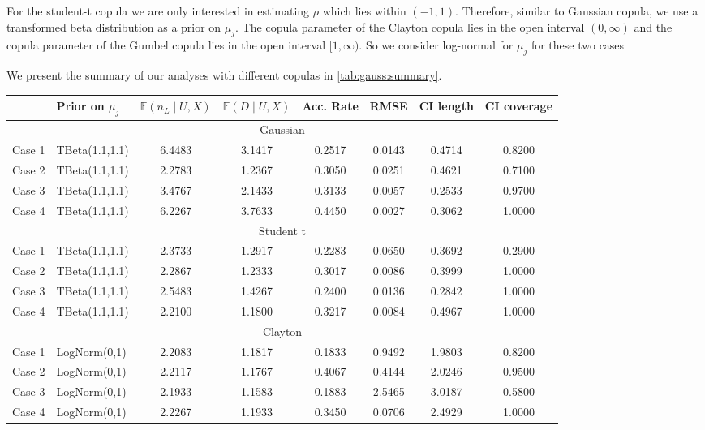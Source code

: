 \documentclass{amsart}
\begin{document}
For the student-t copula we are only interested in estimating $\rho$ which lies within $(-1,1)$. Therefore, similar to Gaussian copula, we use a transformed beta distribution as a prior on $\mu_j$. The copula parameter of the Clayton copula lies in the open interval $(0,\infty)$ and the copula parameter of the Gumbel copula lies in the open interval $[1,\infty)$. So we consider log-normal for $\mu_j$ for these two cases

We present the summary of our analyses with different copulas in \cref{tab:gauss:summary}. 

\begin{table}[ht]
	\centering
	\scriptsize{
	\begin{tabular}{ll|cccccc}
		\toprule
		& Prior on $\mu_j$ & $\mathbb{E}(n_L\mid U,X)$ & $\mathbb{E}(D\mid U,X)$ & Acc. Rate & RMSE & CI length & CI coverage \\ 
		\midrule
		\multicolumn{8}{c}{Gaussian} \\
		\midrule
		Case 1 & TBeta(1.1,1.1) & 6.4483 & 3.1417 & 0.2517 & 0.0143 & 0.4714 & 0.8200 \\ 
		Case 2 & TBeta(1.1,1.1) & 2.2783 & 1.2367 & 0.3050 & 0.0251 & 0.4621 & 0.7100 \\ 
		Case 3 & TBeta(1.1,1.1) & 3.4767 & 2.1433 & 0.3133 & 0.0057 & 0.2533 & 0.9700 \\ 
		Case 4 & TBeta(1.1,1.1) & 6.2267 & 3.7633 & 0.4450 & 0.0027 & 0.3062 & 1.0000 \\ 
		\midrule
		\multicolumn{8}{c}{Student t} \\
		\midrule
		Case 1 & TBeta(1.1,1.1) & 2.3733 & 1.2917 & 0.2283 & 0.0650 & 0.3692 & 0.2900 \\ 
		Case 2 & TBeta(1.1,1.1) & 2.2867 & 1.2333 & 0.3017 & 0.0086 & 0.3999 & 1.0000 \\ 
		Case 3 & TBeta(1.1,1.1) & 2.5483 & 1.4267 & 0.2400 & 0.0136 & 0.2842 & 1.0000 \\ 
		Case 4 & TBeta(1.1,1.1) & 2.2100 & 1.1800 & 0.3217 & 0.0084 & 0.4967 & 1.0000 \\ 
		\midrule
		\multicolumn{8}{c}{Clayton} \\
		\midrule
		Case 1 & LogNorm(0,1) & 2.2083 & 1.1817 & 0.1833 & 0.9492 & 1.9803 & 0.8200 \\ 
		Case 2 & LogNorm(0,1) & 2.2117 & 1.1767 & 0.4067 & 0.4144 & 2.0246 & 0.9500 \\ 
		Case 3 & LogNorm(0,1) & 2.1933 & 1.1583 & 0.1883 & 2.5465 & 3.0187 & 0.5800 \\ 
		Case 4 & LogNorm(0,1) & 2.2267 & 1.1933 & 0.3450 & 0.0706 & 2.4929 & 1.0000 \\

\end{tabular}}
\end{table}
\end{document}
